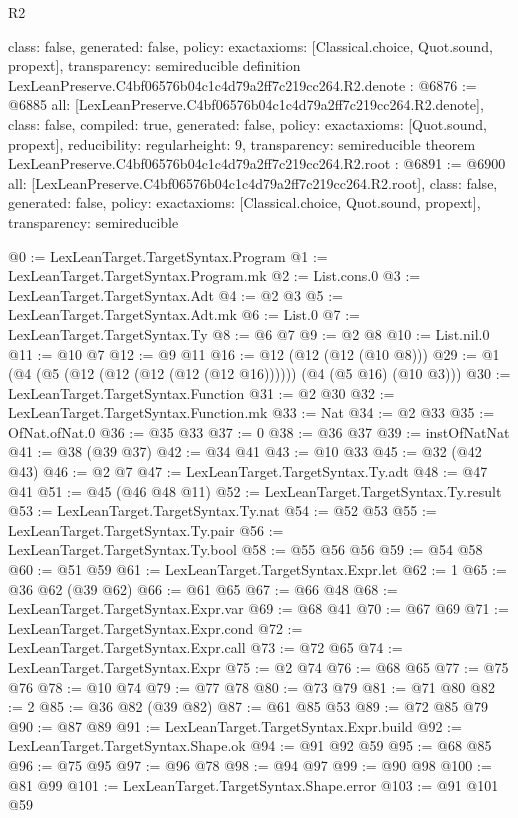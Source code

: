 \begin{lexlean}{R2}
\begin{coremodule}
{  class: false,
  generated: false,
  policy: exact{axioms: [Classical.choice, Quot.sound, propext]},
  transparency: semireducible
}
definition LexLeanPreserve.C4bf06576b04c1c4d79a2ff7c219cc264.R2.denote : @6876 := @6885 {
  all: [LexLeanPreserve.C4bf06576b04c1c4d79a2ff7c219cc264.R2.denote],
  class: false,
  compiled: true,
  generated: false,
  policy: exact{axioms: [Quot.sound, propext]},
  reducibility: regular{height: 9},
  transparency: semireducible
}
theorem LexLeanPreserve.C4bf06576b04c1c4d79a2ff7c219cc264.R2.root : @6891 := @6900 {
  all: [LexLeanPreserve.C4bf06576b04c1c4d79a2ff7c219cc264.R2.root],
  class: false,
  generated: false,
  policy: exact{axioms: [Classical.choice, Quot.sound, propext]},
  transparency: semireducible
}

@0 := LexLeanTarget.TargetSyntax.Program
@1 := LexLeanTarget.TargetSyntax.Program.mk
@2 := List.cons.{0}
@3 := LexLeanTarget.TargetSyntax.Adt
@4 := @2 @3
@5 := LexLeanTarget.TargetSyntax.Adt.mk
@6 := List.{0}
@7 := LexLeanTarget.TargetSyntax.Ty
@8 := @6 @7
@9 := @2 @8
@10 := List.nil.{0}
@11 := @10 @7
@12 := @9 @11
@16 := @12 (@12 (@12 (@10 @8)))
@29 := @1 (@4 (@5 (@12 (@12 (@12 (@12 (@12 @16)))))) (@4 (@5 @16) (@10 @3)))
@30 := LexLeanTarget.TargetSyntax.Function
@31 := @2 @30
@32 := LexLeanTarget.TargetSyntax.Function.mk
@33 := Nat
@34 := @2 @33
@35 := OfNat.ofNat.{0}
@36 := @35 @33
@37 := 0
@38 := @36 @37
@39 := instOfNatNat
@41 := @38 (@39 @37)
@42 := @34 @41
@43 := @10 @33
@45 := @32 (@42 @43)
@46 := @2 @7
@47 := LexLeanTarget.TargetSyntax.Ty.adt
@48 := @47 @41
@51 := @45 (@46 @48 @11)
@52 := LexLeanTarget.TargetSyntax.Ty.result
@53 := LexLeanTarget.TargetSyntax.Ty.nat
@54 := @52 @53
@55 := LexLeanTarget.TargetSyntax.Ty.pair
@56 := LexLeanTarget.TargetSyntax.Ty.bool
@58 := @55 @56 @56
@59 := @54 @58
@60 := @51 @59
@61 := LexLeanTarget.TargetSyntax.Expr.let
@62 := 1
@65 := @36 @62 (@39 @62)
@66 := @61 @65
@67 := @66 @48
@68 := LexLeanTarget.TargetSyntax.Expr.var
@69 := @68 @41
@70 := @67 @69
@71 := LexLeanTarget.TargetSyntax.Expr.cond
@72 := LexLeanTarget.TargetSyntax.Expr.call
@73 := @72 @65
@74 := LexLeanTarget.TargetSyntax.Expr
@75 := @2 @74
@76 := @68 @65
@77 := @75 @76
@78 := @10 @74
@79 := @77 @78
@80 := @73 @79
@81 := @71 @80
@82 := 2
@85 := @36 @82 (@39 @82)
@87 := @61 @85 @53
@89 := @72 @85 @79
@90 := @87 @89
@91 := LexLeanTarget.TargetSyntax.Expr.build
@92 := LexLeanTarget.TargetSyntax.Shape.ok
@94 := @91 @92 @59
@95 := @68 @85
@96 := @75 @95
@97 := @96 @78
@98 := @94 @97
@99 := @90 @98
@100 := @81 @99
@101 := LexLeanTarget.TargetSyntax.Shape.error
@103 := @91 @101 @59

\end{coremodule}
\end{lexlean}
